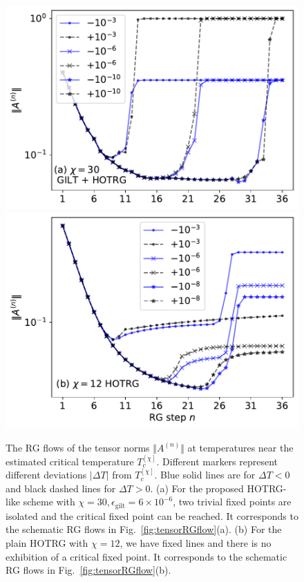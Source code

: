 \documentclass[aps,prr,reprint,superscriptaddress,nofootinbib,floatfix]{revtex4-2}
\begin{document}
\begin{figure}[t]
    \includegraphics[width=\columnwidth,valign=c]{AnormFlow-a.pdf}
    \includegraphics[width=\columnwidth,valign=c]{AnormFlow-b.pdf}
    \caption{\label{fig:flowAnorm}
        The RG flows of the tensor norms $\Vert A^{(n)} \Vert$ at temperatures near the estimated critical temperature $T_c^{[\chi]}$. 
        Different markers represent different deviations $| \Delta T| $ from $T_c^{[\chi]}$. Blue solid lines are for $\Delta T<0$ and black dashed lines for $\Delta T>0$. 
        (a) For the proposed HOTRG-like scheme with $\chi = 30,\epsilon_{\text{gilt}} = 6\times 10^{-6}$, two trivial fixed points are isolated and the critical fixed point can be reached. It corresponds to the schematic RG flows in Fig.~\ref{fig:tensorRGflow}(a). 
        (b) For the plain HOTRG with $\chi = 12$, we have fixed lines and there is no exhibition of a critical fixed point. 
        It corresponds to the schematic RG flows in Fig.~\ref{fig:tensorRGflow}(b).
    }
\end{figure}
%
\end{document}
